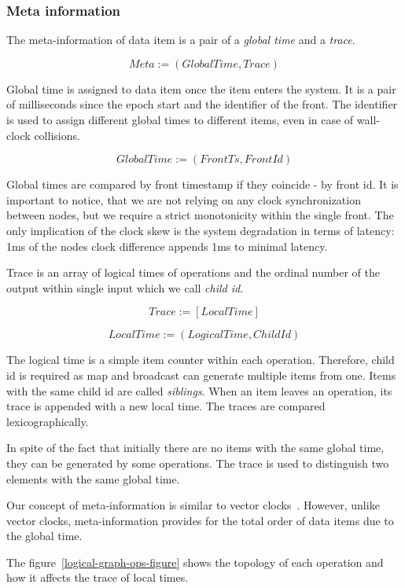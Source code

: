 \subsubsection{Meta information}
The meta-information of data item is a pair of a {\it global time} and a {\it trace}.

\[Meta := (GlobalTime, Trace)\]

Global time is assigned to data item once the item enters the system. It is a pair of milliseconds since the epoch start and the identifier of the front. The identifier is used to assign different global times to different items, even in case of wall-clock collisions. 

\[GlobalTime := (FrontTs, FrontId)\]

Global times are compared by front timestamp if they coincide - by front id. It is important to notice, that we are not relying on any clock synchronization between nodes, but we require a strict monotonicity within the single front. The only implication of the clock skew is the system degradation in terms of latency: 1ms of the nodes clock difference appends 1ms to minimal latency.

Trace is an array of logical times of operations and the ordinal number of the output within single input which we call {\it child id}. 

\[Trace := [LocalTime]\]

\[LocalTime := (LogicalTime, ChildId)\]

The logical time is a simple item counter within each operation. Therefore, child id is required as map and broadcast can generate multiple items from one. Items with the same child id are called {\it siblings}. When an item leaves an operation, its trace is appended with a new local time. The traces are compared lexicographically.

In spite of the fact that initially there are no items with the same global time, they can be generated by some operations. The trace is used to distinguish two elements with the same global time.

Our concept of meta-information is similar to vector clocks~\cite{fidge1988timestamps, mattern88virtualtime}. However, unlike vector clocks, meta-information provides for the total order of data items due to the global time.

The figure~\ref{logical-graph-ops-figure} shows the topology of each operation and how it affects the trace of local times.

